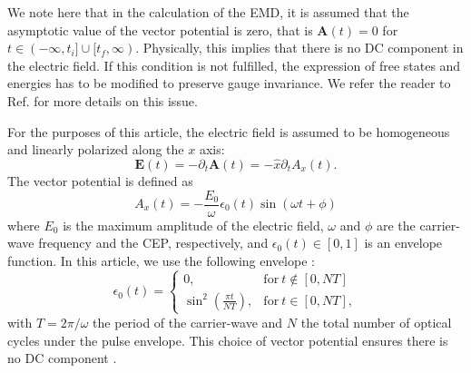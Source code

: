 \documentclass[9pt,twocolumn,twoside]{osajnl}
\begin{document}
We note here that in the calculation of the EMD, it is assumed that the asymptotic value of the vector potential is zero, that is $\mathbf{A}(t)=0$ for $t \in (-\infty,t_{i}] \cup [t_f,\infty)$. Physically, this implies that there is no DC component in the electric field. If this condition is not fulfilled, the expression of free states and energies has to be modified to preserve gauge invariance. We refer the reader to Ref. \cite{PhysRevB.92.035401} for more details on this issue.


For the purposes of this article, the electric field is assumed to be homogeneous and linearly polarized along the $x$ axis:
\begin{equation}\label{eq_field}
\textbf{E}(t)=-\partial_t \textbf{A}(t)= -\hat{x} \partial_t A_x (t) .
\end{equation}
The vector potential is defined as
\begin{equation}
A_x(t) = - \frac{E_0}{\omega} \epsilon_0(t) \sin(\omega t + \phi)
\end{equation}
where $E_0$ is the maximum amplitude of the electric field, $\omega$ and $\phi$ are the carrier-wave frequency and the CEP, respectively, and $\epsilon_0 (t) \in [0,1]$ is an  envelope function.
In this article, we use the following envelope \cite{PhysRevA.65.061802}:
\begin{equation*}\label{eq_env}
\epsilon_0 (t) = 
\begin{cases}
  0, & \mathrm{for}\ t\notin \left[0,NT \right]\\
  \sin^2(\frac{\pi t}{NT}), & \mathrm{for}\ t\in \left[0,NT \right],
\end{cases}
\end{equation*}
with $T=2\pi/\omega$ the period of the carrier-wave and $N$ the total number of optical cycles under the pulse envelope.
This choice of vector potential ensures there is no DC component \cite{PhysRevA.65.061802}.
\end{document}
